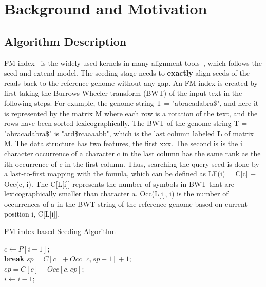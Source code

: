 \documentclass[9pt,conference]{IEEEtran}
\newcommand*\circled[1]{\tikz[baseline=(char.base)]{
		\node[shape=circle,fill,inner sep=0.5pt] (char) {\textcolor{white}{#1}};}}
\begin{document}
\section{Background and Motivation}
\subsection{Algorithm Description}
FM-index~\cite{bwt} is the widely used kernels in many alignment tools~\cite{ahmed2016comparison}, which follows the seed-and-extend model. The seeding stage needs to \textbf{exactly} align seeds of the reads back to the reference genome without any gap. An FM-index is created by first taking the Burrows-Wheeler transform (BWT) of the input text in the following steps. For example, \circled{1} the genome string T = "abracadabra\$", \circled{2} and here it is represented by the matrix M where each row is a rotation of the text, and the rows have been sorted lexicographically. \circled{3} The BWT of the genome string T = "abracadabra\$" is "ard\$rcaaaabb", which is the last column labeled \textbf{L} of matrix M. The data structure has two features, the first xxx. The second is is the i character occurrence of a character c in the last column has the same rank as the ith occurrence of c in the first column. Thus, searching the query seed is done by a last-to-first mapping with the fomula, which can be defined as LF(i) = C[c] + Occ(c, i). The C[L[i]] represents the number of symbols in BWT that are lexicographically smaller than character a. Occ(L[i], i) is the number of occurrences of a in the BWT string of the reference genome based on current position i, C[L[i]].

\begin{algorithm}[!htbp]
\LinesNumbered
\caption{FM-index based Seeding Algorithm}\label{algo:fm}
\small
{}
 {
    $c \leftarrow P[i-1]$;\\
     {\textbf{break}}
    $sp = C[c] + Occ[c, sp-1]+1$;\\
    $ep = C[c] + Occ[c, ep]$;\\
    $i \leftarrow i - 1$;\\
}

\end{algorithm}
\end{document}
